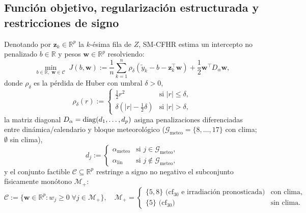 \subsection{Función objetivo, regularización estructurada y restricciones de signo}

Denotando por $\mathbf{z}_k \in \mathbb{R}^p$ la $k$-ésima fila de $Z$, SM-CFHR estima un intercepto no penalizado $b \in \mathbb{R}$ y pesos $\mathbf{w} \in \mathbb{R}^p$ resolviendo:
\begin{equation}
\min_{b \in \mathbb{R},\; \mathbf{w} \in \mathcal{C}} \; J(b, \mathbf{w}) := \frac{1}{n}\sum_{k=1}^{n} \rho_\delta\!\left(\tilde{y}_k - b - \mathbf{z}_k^\top \mathbf{w}\right) + \frac{1}{2}\mathbf{w}^\top D_\alpha \mathbf{w},
\label{eq:objetivo_smcfhr}
\end{equation}
donde $\rho_\delta$ es la pérdida de Huber con umbral $\delta > 0$,
\begin{equation}
\rho_\delta(r) := \begin{cases}
\frac{1}{2} r^2 & \text{si } |r| \le \delta, \\
\delta\left(|r| - \frac{1}{2}\delta\right) & \text{si } |r| > \delta,
\end{cases}
\label{eq:huber}
\end{equation}
la matriz diagonal $D_\alpha = \operatorname{diag}(d_1,\dots,d_p)$ asigna penalizaciones diferenciadas entre dinámica/calendario y bloque meteorológico ($\mathcal{G}_{\mathrm{meteo}} = \{8,\dots,17\}$ con clima; $\emptyset$ sin clima),
\begin{equation}
d_j := \begin{cases}
\alpha_{\mathrm{meteo}} & \text{si } j \in \mathcal{G}_{\mathrm{meteo}}, \\
\alpha_{\mathrm{lin}} & \text{si } j \notin \mathcal{G}_{\mathrm{meteo}},
\end{cases}
\label{eq:d_alpha}
\end{equation}
y el conjunto factible $\mathcal{C} \subseteq \mathbb{R}^p$ restringe a signo no negativo el subconjunto físicamente monótono $\mathcal{M}_+$:
\begin{equation}
\mathcal{C} := \{\mathbf{w} \in \mathbb{R}^p : w_j \ge 0 \;\forall j \in \mathcal{M}_+\},
\quad
\mathcal{M}_+ = \begin{cases}
\{5, 8\} \text{ ($\mathrm{cf}_{30}$ e irradiación pronosticada)} & \text{con clima}, \\
\{5\} \text{ ($\mathrm{cf}_{30}$)} & \text{sin clima}.
\end{cases}
\label{eq:conjunto_factible}
\end{equation}
